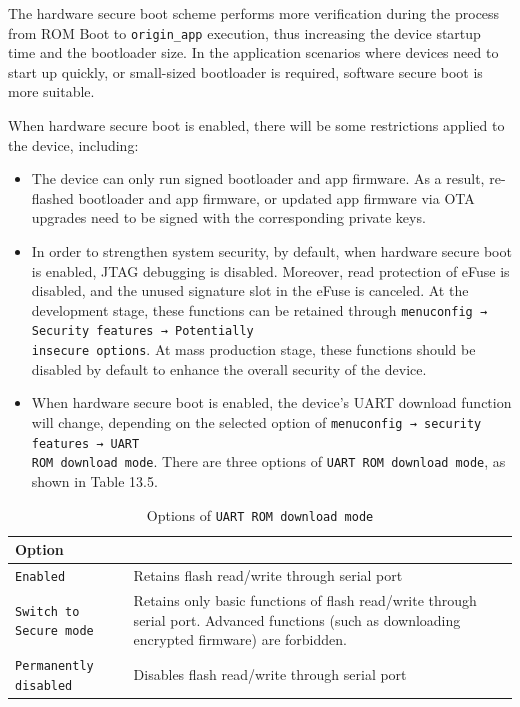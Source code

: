 \documentclass[a4paper,12pt,openany]{book}
\renewcommand{\arraystretch}{1}
\begin{document}
The hardware secure boot scheme performs more verification during the process from ROM Boot to \verb|origin_app| execution, thus increasing the device startup time and the bootloader size. In the application scenarios where devices need to start up quickly, or small-sized bootloader is required, software secure boot is more suitable.

When hardware secure boot is enabled, there will be some restrictions applied to the device, including: 

\begin{itemize}[leftmargin=1.5em]
    \item The device can only run signed bootloader and app firmware. As a result, re-flashed bootloader and app firmware, or updated app firmware via OTA upgrades need to be signed with the corresponding private keys.
    \item In order to strengthen system security, by default, when hardware secure boot is enabled, JTAG debugging is disabled. Moreover, read protection of eFuse is disabled, and the unused signature slot in the eFuse is canceled. At the development stage, these functions can be retained through \verb|menuconfig → Security features → Potentially |\\ \verb|insecure options|. At mass production stage, these functions should be disabled by default to enhance the overall security of the device.
    \item When hardware secure boot is enabled, the device’s UART download function will change, depending on the selected option of \verb|menuconfig → security features → UART|\\ \verb|ROM download mode|. There are three options of \verb|UART ROM download mode|, as shown in Table 13.5.
\end{itemize}

\begin{table}[h!]
    \renewcommand{\arraystretch}{1.4}
    \caption{Options of \texttt{UART ROM download mode}}
    \begin{tabular}{|>{\Centering}m{13em}|>{\RaggedRight}m{25.5em}|}
        \hline
        \rowcolor{LightBlue} \textbf{Option}&\multicolumn{1}{c|}{\textbf{Description}}\\
        \hline
        \verb|Enabled|&Retains flash read/write through serial port\\
        \hline
        \verb|Switch to Secure mode|&Retains only basic functions of flash read/write through serial port. Advanced functions (such as downloading encrypted firmware) are forbidden.\\
        \hline
        \verb|Permanently disabled|&Disables flash read/write through serial port\\
        \hline
    \end{tabular}
\end{table}
\end{document}
